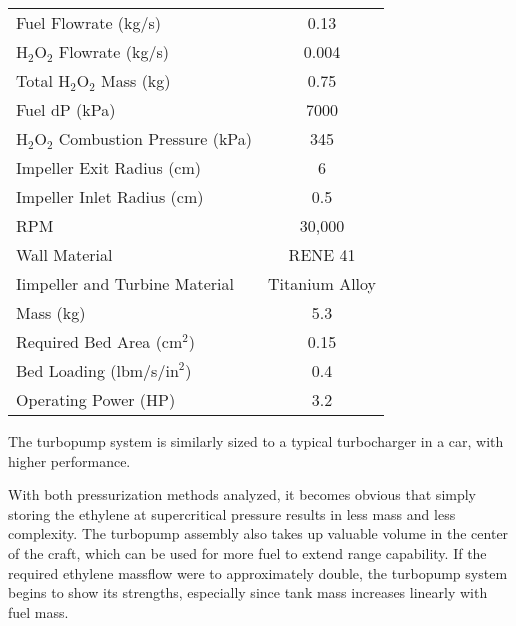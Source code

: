 \begin{center}
\begin{tabular}{l  c}
Fuel Flowrate (kg/s) & 0.13 \\
$\text{H}_2\text{O}_2$ Flowrate (kg/s) & 0.004 \\
Total $\text{H}_2\text{O}_2$ Mass (kg) & 0.75 \\
Fuel dP (kPa) & 7000 \\
$\text{H}_2\text{O}_2$ Combustion Pressure (kPa) & 345 \\
Impeller Exit Radius (cm) & 6 \\
Impeller Inlet Radius (cm) & 0.5 \\
RPM & 30,000 \\
Wall Material & RENE 41 \\
Iimpeller and Turbine Material & Titanium Alloy \\
Mass (kg) & 5.3 \\
Required Bed Area ($\text{cm}^2$) & 0.15 \\
Bed Loading (lbm/s/$\text{in}^2$) & 0.4 \\
Operating Power (HP) & 3.2
\end{tabular}
\label{tab:turboParams}
\end{center}

The turbopump system is similarly sized to a typical turbocharger in a car, with higher performance. 

With both pressurization methods analyzed, it becomes obvious that simply storing the ethylene at supercritical pressure results in less mass and less complexity. The turbopump assembly also takes up valuable volume in the center of the craft, which can be used for more fuel to extend range capability. If the required ethylene massflow were to approximately double, the turbopump system begins to show its strengths, especially since tank mass increases linearly with fuel mass. 
 
